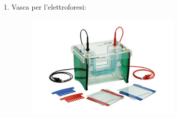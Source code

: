 \documentclass{article}
\begin{document}
\begin{enumerate}
\begin{figure}[H]
		\end{figure}

		\vspace{0.5cm}


		\item Vasca per l'elettroforesi:

		\begin{figure}[H]

			\includegraphics[width=0.7\textwidth]{./immagini/vasca_elettroforesi.jpg}
			\label{vasca_elettroforesi}

		\end{figure}

		\vspace{0.5cm}

	\end{enumerate}


	\newpage
	
	\newpage
	
	\newpage
	
	\newpage

	
\end{document}
